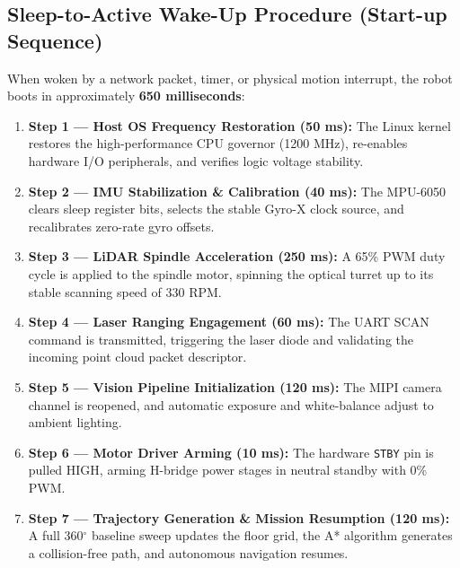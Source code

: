 \documentclass[11pt,a4paper]{article}
\begin{document}
\subsection{Sleep-to-Active Wake-Up Procedure (Start-up Sequence)}
When woken by a network packet, timer, or physical motion interrupt, the robot boots in approximately \textbf{650 milliseconds}:
\begin{enumerate}[noitemsep]
    \item \textbf{Step 1 --- Host OS Frequency Restoration (50 ms):} The Linux kernel restores the high-performance CPU governor (1200 MHz), re-enables hardware I/O peripherals, and verifies logic voltage stability.
    \item \textbf{Step 2 --- IMU Stabilization \& Calibration (40 ms):} The MPU-6050 clears sleep register bits, selects the stable Gyro-X clock source, and recalibrates zero-rate gyro offsets.
    \item \textbf{Step 3 --- LiDAR Spindle Acceleration (250 ms):} A 65\% PWM duty cycle is applied to the spindle motor, spinning the optical turret up to its stable scanning speed of 330 RPM.
    \item \textbf{Step 4 --- Laser Ranging Engagement (60 ms):} The UART SCAN command is transmitted, triggering the laser diode and validating the incoming point cloud packet descriptor.
    \item \textbf{Step 5 --- Vision Pipeline Initialization (120 ms):} The MIPI camera channel is reopened, and automatic exposure and white-balance adjust to ambient lighting.
    \item \textbf{Step 6 --- Motor Driver Arming (10 ms):} The hardware \texttt{STBY} pin is pulled HIGH, arming H-bridge power stages in neutral standby with 0\% PWM.
    \item \textbf{Step 7 --- Trajectory Generation \& Mission Resumption (120 ms):} A full 360$^\circ$ baseline sweep updates the floor grid, the A* algorithm generates a collision-free path, and autonomous navigation resumes.
\end{enumerate}
\end{document}
